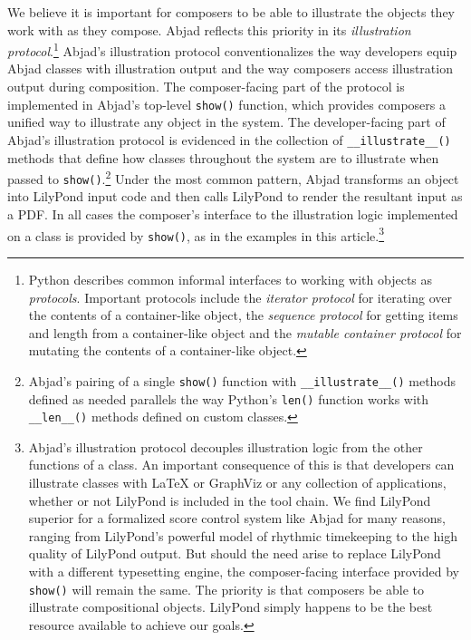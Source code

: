 \documentclass{article}
\begin{document}
We believe it is important for composers to be able to illustrate the objects
they work with as they compose. Abjad reflects this priority in its
\emph{illustration protocol}.\footnote{Python describes common informal
interfaces to working with objects as \emph{protocols}. Important protocols
include the \emph{iterator protocol} for iterating over the contents of a
container-like object, the \emph{sequence protocol} for getting items and
length from a container-like object and the \emph{mutable container protocol}
for mutating the contents of a container-like object.} Abjad's illustration
protocol conventionalizes the way developers equip Abjad classes with
illustration output and the way composers access illustration output during
composition. The composer-facing part of the protocol is implemented in Abjad's
top-level \texttt{show()} function, which provides composers a unified way to
illustrate any object in the system. The developer-facing part of Abjad's
illustration protocol is evidenced in the collection of
\texttt{\_\_illustrate\_\_()} methods that define how classes throughout the
system are to illustrate when passed to \texttt{show()}.\footnote{Abjad's
pairing of a single \texttt{show()} function with \texttt{\_\_illustrate\_\_()}
methods defined as needed parallels the way Python's \texttt{len()} function
works with \texttt{\_\_len\_\_()} methods defined on custom classes.} Under the
most common pattern, Abjad transforms an object into LilyPond input code and
then calls LilyPond to render the resultant input as a PDF. In all cases the
composer's interface to the illustration logic implemented on a  class is
provided by \texttt{show()}, as in the examples in this
article.\footnote{Abjad's illustration protocol decouples illustration logic
from the other functions of a class. An important consequence of this is that
developers can illustrate classes with LaTeX or GraphViz or any collection of
applications, whether or not LilyPond is included in the tool chain. We find
LilyPond superior for a formalized score control system like Abjad for many
reasons, ranging from LilyPond's powerful model of rhythmic timekeeping to the
high quality of LilyPond output. But should the need arise to replace LilyPond
with a different typesetting engine, the composer-facing  interface provided by
\texttt{show()} will remain the same. The priority is that composers be able to
illustrate compositional objects. LilyPond simply happens to be the best
resource available to achieve our goals.}
\end{document}
